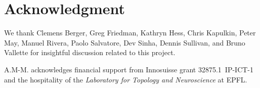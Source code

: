 
\section*{Acknowledgment}

We thank Clemens Berger, Greg Friedman, Kathryn Hess, Chris Kapulkin, Peter May, Manuel Rivera, Paolo Salvatore, Dev Sinha, Dennis Sullivan, and Bruno Vallette for insightful discussion related to this project.

A.M-M. acknowledges financial support from Innosuisse grant 32875.1~IP-ICT-1 and the hospitality of the \textit{Laboratory for Topology and Neuroscience} at EPFL.

